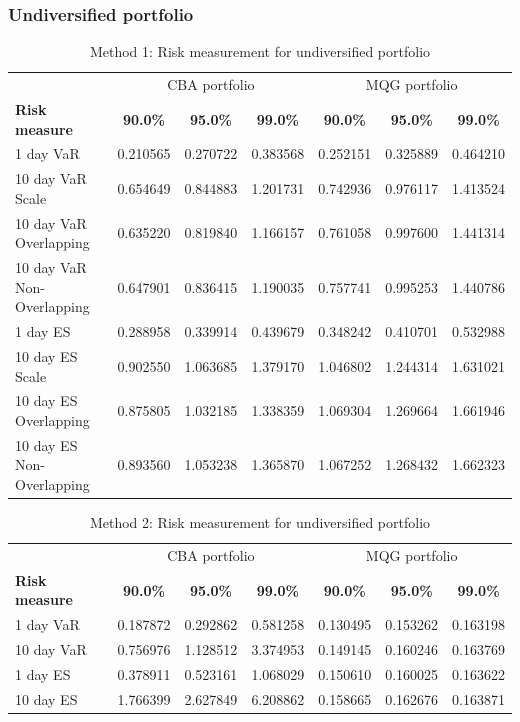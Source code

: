 \subsubsection{Undiversified portfolio}
\begin{table}[H]
    \centering
    \begin{tabular}{@{} l c c c | c c c @{}}
        \toprule
        &\multicolumn{3}{c}{CBA portfolio}&\multicolumn{3}{c}{MQG portfolio}\\
        \textbf{Risk measure} & \textbf{90.0\%} & \textbf{95.0\%} & \textbf{99.0\%}& \textbf{90.0\%} & \textbf{95.0\%} & \textbf{99.0\%} \\
        \midrule
        1 day VaR                & 0.210565 & 0.270722 & 0.383568 & 0.252151 & 0.325889 & 0.464210\\
        10 day VaR Scale         & 0.654649 & 0.844883 & 1.201731 & 0.742936 & 0.976117 & 1.413524\\
        10 day VaR Overlapping    & 0.635220 & 0.819840 & 1.166157 & 0.761058 & 0.997600 & 1.441314\\
        10 day VaR Non-Overlapping & 0.647901 & 0.836415 & 1.190035 & 0.757741 & 0.995253 & 1.440786\\
        1 day ES                 & 0.288958 & 0.339914 & 0.439679 & 0.348242 & 0.410701 & 0.532988\\
        10 day ES Scale          & 0.902550 & 1.063685 & 1.379170 & 1.046802 & 1.244314 & 1.631021\\
        10 day ES Overlapping      & 0.875805 & 1.032185 & 1.338359 & 1.069304 & 1.269664 & 1.661946\\
        10 day ES Non-Overlapping  & 0.893560 & 1.053238 & 1.365870 & 1.067252 & 1.268432 & 1.662323\\ \bottomrule
    \end{tabular}
    \caption{Method 1: Risk measurement for undiversified portfolio}
    \label{tab:method_1_undiversified_port}
\end{table}
\begin{table}[H]
    \centering
    \begin{tabular}{@{} l c c c | c c c @{}}
        \toprule
        &\multicolumn{3}{c}{CBA portfolio}&\multicolumn{3}{c}{MQG portfolio}\\
        \textbf{Risk measure} & \textbf{90.0\%} & \textbf{95.0\%} & \textbf{99.0\%}& \textbf{90.0\%} & \textbf{95.0\%} & \textbf{99.0\%} \\
        \midrule
        1 day VaR                & 0.187872 & 0.292862 & 0.581258 & 0.130495 & 0.153262 & 0.163198\\
        10 day VaR         & 0.756976 & 1.128512 & 3.374953 & 0.149145 & 0.160246 & 0.163769\\
        1 day ES                & 0.378911 & 0.523161 & 1.068029 & 0.150610 & 0.160025 & 0.163622\\
        10 day ES          & 1.766399 & 2.627849 & 6.208862 & 0.158665 & 0.162676 & 0.163871\\\bottomrule
    \end{tabular}
    \caption{Method 2: Risk measurement for undiversified portfolio}
    \label{tab:method_2_undiversified_port}
\end{table}
